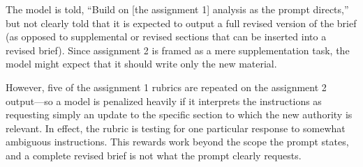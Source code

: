 \documentclass[11pt]{article}
\begin{document}
The model is told, ``Build on [the assignment 1] analysis as the prompt directs,'' but not clearly told that it is expected to output a full revised version of the brief (as opposed to supplemental or revised sections that can be inserted into a revised brief). Since assignment 2 is framed as a mere supplementation task, the model might expect that it should write only the new material.

However, five of the assignment 1 rubrics are repeated on the assignment 2 output---so a model is penalized heavily if it interprets the instructions as requesting simply an update to the specific section to which the new authority is relevant. In effect, the rubric is testing for one particular response to somewhat ambiguous instructions. This rewards work beyond the scope the prompt states, and a complete revised brief is not what the prompt clearly requests.
\end{document}
